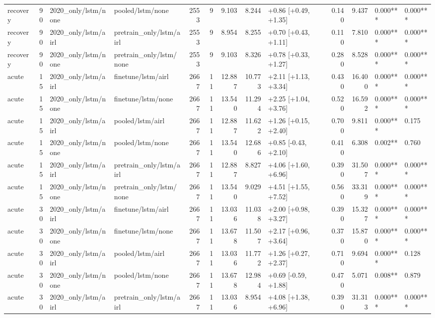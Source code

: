 \begin{tabular}{lrllrrrrlrrll}
recovery & 90 & 2020_only/lstm/none & pooled/lstm/none & 2553 & 9 & 9.103 & 8.244 & +0.86 [+0.49, +1.35] & 0.140 & 9.437 & 0.000*** & 0.000*** \\
recovery & 90 & 2020_only/lstm/airl & pretrain_only/lstm/airl & 2553 & 9 & 8.954 & 8.255 & +0.70 [+0.43, +1.11] & 0.110 & 7.810 & 0.000*** & 0.000*** \\
recovery & 90 & 2020_only/lstm/none & pretrain_only/lstm/none & 2553 & 9 & 9.103 & 8.326 & +0.78 [+0.33, +1.27] & 0.280 & 8.528 & 0.000*** & 0.000*** \\
acute & 15 & 2020_only/lstm/airl & finetune/lstm/airl & 2667 & 11 & 12.887 & 10.773 & +2.11 [+1.13, +3.34] & 0.430 & 16.400 & 0.000*** & 0.000*** \\
acute & 15 & 2020_only/lstm/none & finetune/lstm/none & 2667 & 11 & 13.540 & 11.294 & +2.25 [+1.04, +3.76] & 0.520 & 16.592 & 0.000*** & 0.000*** \\
acute & 15 & 2020_only/lstm/airl & pooled/lstm/airl & 2667 & 11 & 12.887 & 11.622 & +1.26 [+0.15, +2.40] & 0.700 & 9.811 & 0.000*** & 0.175 \\
acute & 15 & 2020_only/lstm/none & pooled/lstm/none & 2667 & 11 & 13.540 & 12.686 & +0.85 [-0.43, +2.10] & 0.410 & 6.308 & 0.002** & 0.760 \\
acute & 15 & 2020_only/lstm/airl & pretrain_only/lstm/airl & 2667 & 11 & 12.887 & 8.827 & +4.06 [+1.60, +6.96] & 0.390 & 31.507 & 0.000*** & 0.000*** \\
acute & 15 & 2020_only/lstm/none & pretrain_only/lstm/none & 2667 & 11 & 13.540 & 9.029 & +4.51 [+1.55, +7.52] & 0.560 & 33.319 & 0.000*** & 0.000*** \\
acute & 30 & 2020_only/lstm/airl & finetune/lstm/airl & 2667 & 11 & 13.036 & 11.038 & +2.00 [+0.98, +3.27] & 0.390 & 15.327 & 0.000*** & 0.000*** \\
acute & 30 & 2020_only/lstm/none & finetune/lstm/none & 2667 & 11 & 13.678 & 11.507 & +2.17 [+0.96, +3.64] & 0.370 & 15.870 & 0.000*** & 0.000*** \\
acute & 30 & 2020_only/lstm/airl & pooled/lstm/airl & 2667 & 11 & 13.036 & 11.772 & +1.26 [+0.27, +2.37] & 0.710 & 9.694 & 0.000*** & 0.128 \\
acute & 30 & 2020_only/lstm/none & pooled/lstm/none & 2667 & 11 & 13.678 & 12.984 & +0.69 [-0.59, +1.88] & 0.470 & 5.071 & 0.008** & 0.879 \\
acute & 30 & 2020_only/lstm/airl & pretrain_only/lstm/airl & 2667 & 11 & 13.036 & 8.954 & +4.08 [+1.38, +6.96] & 0.390 & 31.313 & 0.000*** & 0.000*** \\

\end{tabular}
